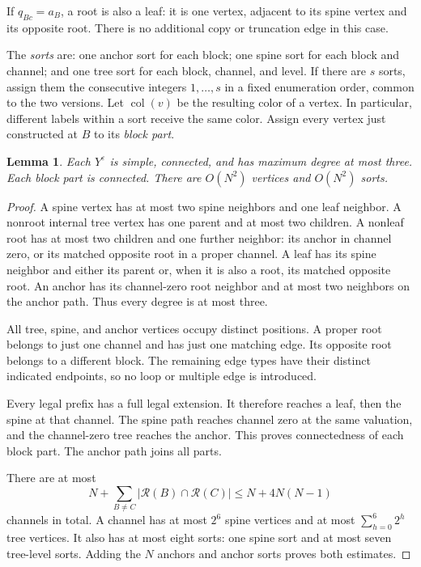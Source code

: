 \documentclass[11pt]{article}
\newtheorem{lemma}[theorem]{Lemma}
\theoremstyle{definition}
\begin{document}
If \(q_{Bc}=a_B\), a root is also a leaf: it is one vertex, adjacent
to its spine vertex and its opposite root.
There is no additional copy or truncation edge in this case.

The \emph{sorts} are: one anchor sort for each block; one spine sort
for each block and channel; and one tree sort for each block, channel,
and level.  If there are \(s\) sorts, assign them the consecutive
integers \(1,\ldots,s\) in a fixed enumeration order, common to the
two versions.
Let \(\operatorname{col}(v)\) be the resulting color of a vertex.
In particular, different labels within a sort receive the same color.
Assign every vertex just constructed at \(B\) to its \emph{block part}.

\begin{lemma}
\label{graph:colored-promises}
Each \(Y^\varepsilon\) is simple, connected, and has maximum degree at most
three.  Each block part is connected.  There are \(O(N^2)\) vertices
and \(O(N^2)\) sorts.
\end{lemma}

\begin{proof}
A spine vertex has at most two spine neighbors and one leaf neighbor.
A nonroot internal tree vertex has one parent and at most two children.
A nonleaf root has at most two children and one further neighbor:
its anchor in channel zero, or its matched opposite root in a proper
channel.  A leaf has its spine neighbor and either its parent or,
when it is also a root, its matched opposite root.
An anchor has its channel-zero root neighbor and at most two neighbors
on the anchor path.
Thus every degree is at most three.

All tree, spine, and anchor vertices occupy distinct positions.
A proper root belongs to just one channel and has just one matching
edge.  Its opposite root belongs to a different block.
The remaining edge types have their distinct indicated endpoints,
so no loop or multiple edge is introduced.

Every legal prefix has a full legal extension.
It therefore reaches a leaf, then the spine at that channel.
The spine path reaches channel zero at the same valuation, and the
channel-zero tree reaches the anchor.
This proves connectedness of each block part.
The anchor path joins all parts.

There are at most
\[
 N+\sum_{B\ne C}\left\lvert{\mathcal R(B)\cap\mathcal R(C)}\right\rvert
 \le N+4N(N-1)
\]
channels in total.
A channel has at most \(2^6\) spine vertices and at most
\(\sum_{h=0}^6 2^h\) tree vertices.
It also has at most eight sorts: one spine sort and at most seven
tree-level sorts.  Adding the \(N\) anchors and anchor sorts proves
both estimates.
\end{proof}
\end{document}
